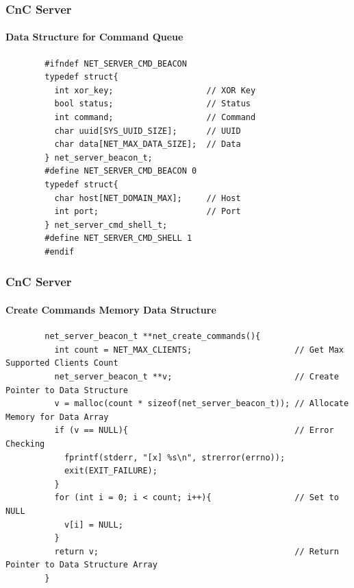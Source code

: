 \documentclass[aspectratio=169]{beamer}
\begin{document}
\begin{frame}[fragile]{}
  \frametitle{CnC Server}
  \framesubtitle{Data Structure for Command Queue}
  \begin{center}
    \begin{tcolorbox}[title=net.c,colback=black]
    \begin{minipage}{0.5\textwidth}
      \begin{verbatim}
        #ifndef NET_SERVER_CMD_BEACON
        typedef struct{
          int xor_key;                   // XOR Key
          bool status;                   // Status
          int command;                   // Command
          char uuid[SYS_UUID_SIZE];      // UUID
          char data[NET_MAX_DATA_SIZE];  // Data
        } net_server_beacon_t;
        #define NET_SERVER_CMD_BEACON 0
        typedef struct{
          char host[NET_DOMAIN_MAX];     // Host
          int port;                      // Port
        } net_server_cmd_shell_t;
        #define NET_SERVER_CMD_SHELL 1
        #endif
      \end{verbatim}
    \end{minipage}
    \end{tcolorbox}
  \end{center}
\end{frame}

\begin{frame}[fragile]{}
  \frametitle{CnC Server}
  \framesubtitle{Create Commands Memory Data Structure}
  \begin{center}
    \begin{tcolorbox}[title=net.c,colback=black]
    \begin{minipage}{0.5\textwidth}
      \begin{verbatim}
        net_server_beacon_t **net_create_commands(){
          int count = NET_MAX_CLIENTS;                     // Get Max Supported Clients Count
          net_server_beacon_t **v;                         // Create Pointer to Data Structure
          v = malloc(count * sizeof(net_server_beacon_t)); // Allocate Memory for Data Array
          if (v == NULL){                                  // Error Checking
            fprintf(stderr, "[x] %s\n", strerror(errno));
            exit(EXIT_FAILURE);
          }
          for (int i = 0; i < count; i++){                 // Set to NULL
            v[i] = NULL;
          }
          return v;                                        // Return Pointer to Data Structure Array
        }
      \end{verbatim}
    \end{minipage}
    \end{tcolorbox}
  \end{center}
\end{frame}
\end{document}
